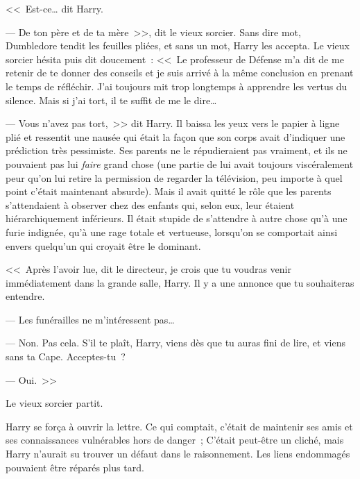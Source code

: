 <<~Est-ce… dit Harry.

--- De ton père et de ta mère~>>, dit le vieux sorcier. Sans dire mot, Dumbledore tendit les feuilles pliées, et sans un mot, Harry les accepta. Le vieux sorcier hésita puis dit doucement~: <<~Le professeur de Défense m'a dit de me retenir de te donner des conseils et je suis arrivé à la même conclusion en prenant le temps de réfléchir. J'ai toujours mit trop longtemps à apprendre les vertus du silence. Mais si j'ai tort, il te suffit de me le dire…

--- Vous n'avez pas tort,~>> dit Harry. Il baissa les yeux vers le papier à ligne plié et ressentit une nausée qui était la façon que son corps avait d'indiquer une prédiction très pessimiste. Ses parents ne le répudieraient pas vraiment, et ils ne pouvaient pas lui \emph{faire} grand chose (une partie de lui avait toujours viscéralement peur qu'on lui retire la permission de regarder la télévision, peu importe à quel point c'était maintenant absurde). Mais il avait quitté le rôle que les parents s'attendaient à observer chez des enfants qui, selon eux, leur étaient hiérarchiquement inférieurs. Il était stupide de s'attendre à autre chose qu'à une furie indignée, qu'à une rage totale et vertueuse, lorsqu'on se comportait ainsi envers quelqu'un qui croyait être le dominant.

<<~Après l'avoir lue, dit le directeur, je crois que tu voudras venir immédiatement dans la grande salle, Harry. Il y a une annonce que tu souhaiteras entendre.

--- Les funérailles ne m'intéressent pas…

--- Non. Pas cela. S'il te plaît, Harry, viens dès que tu auras fini de lire, et viens sans ta Cape. Acceptes-tu~?

--- Oui.~>>

Le vieux sorcier partit.

Harry se força à ouvrir la lettre. Ce qui comptait, c'était de maintenir ses amis et ses connaissances vulnérables hors de danger~; C'était peut-être un cliché, mais Harry n'aurait su trouver un défaut dans le raisonnement. Les liens endommagés pouvaient être réparés plus tard.

